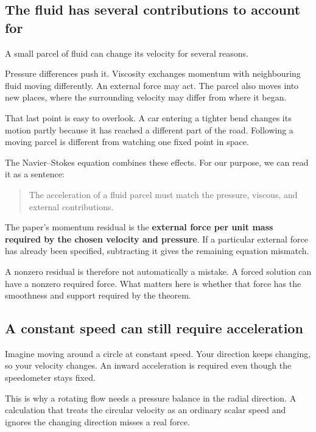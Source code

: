 \documentclass[
  english,
  11pt,
]{article}
\begin{document}
\subsection{The fluid has several contributions to account
for}\label{the-fluid-has-several-contributions-to-account-for}

A small parcel of fluid can change its velocity for several reasons.

Pressure differences push it. Viscosity exchanges momentum with
neighbouring fluid moving differently. An external force may act. The
parcel also moves into new places, where the surrounding velocity may
differ from where it began.

That last point is easy to overlook. A car entering a tighter bend
changes its motion partly because it has reached a different part of the
road. Following a moving parcel is different from watching one fixed
point in space.

The Navier--Stokes equation combines these effects. For our purpose, we
can read it as a sentence:

\begin{quote}
The acceleration of a fluid parcel must match the pressure, viscous, and
external contributions.
\end{quote}

The paper's momentum residual is the \textbf{external force per unit
mass required by the chosen velocity and pressure}. If a particular
external force has already been specified, subtracting it gives the
remaining equation mismatch.

A nonzero residual is therefore not automatically a mistake. A forced
solution can have a nonzero required force. What matters here is whether
that force has the smoothness and support required by the theorem.

\subsection{A constant speed can still require
acceleration}\label{a-constant-speed-can-still-require-acceleration}

Imagine moving around a circle at constant speed. Your direction keeps
changing, so your velocity changes. An inward acceleration is required
even though the speedometer stays fixed.

This is why a rotating flow needs a pressure balance in the radial
direction. A calculation that treats the circular velocity as an
ordinary scalar speed and ignores the changing direction misses a real
force.
\end{document}
